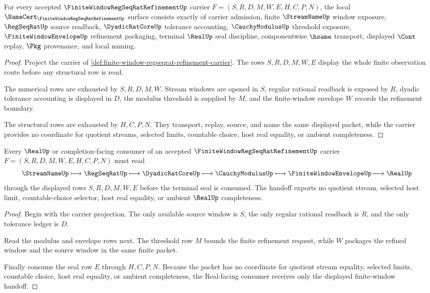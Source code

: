 \begin{theorem}
\label{thm:finite-window-regseqrat-refinement-namecert-obligations}
For every accepted $\FiniteWindowRegSeqRatRefinementUp$ carrier $F=(S,R,D,M,W,E,H,C,P,N)$, the local $\NameCert_{\FiniteWindowRegSeqRatRefinementUp}$ surface consists exactly of carrier admission, finite $\StreamNameUp$ window exposure, $\RegSeqRatUp$ source readback, $\DyadicRatCoreUp$ tolerance accounting, $\CauchyModulusUp$ threshold exposure, $\FiniteWindowEnvelopeUp$ refinement packaging, terminal $\RealUp$ seal discipline, componentwise $\hsame$ transport, displayed $\Cont$ replay, $\Pkg$ provenance, and local naming.
\end{theorem}
\begin{proof}
Project the carrier of \autoref{def:finite-window-regseqrat-refinement-carrier}. The rows $S,R,D,M,W,E$ display the whole finite observation route before any structural row is read.

The numerical rows are exhausted by $S,R,D,M,W$. Stream windows are opened in $S$, regular rational readback is exposed by $R$, dyadic tolerance accounting is displayed in $D$, the modulus threshold is supplied by $M$, and the finite-window envelope $W$ records the refinement boundary.

The structural rows are exhausted by $H,C,P,N$. They transport, replay, source, and name the same displayed packet, while the carrier provides no coordinate for quotient streams, selected limits, countable choice, host real equality, or ambient completeness.
\end{proof}

\begin{theorem}
\label{thm:finite-window-regseqrat-refinement-real-handoff}
Every $\RealUp$ or completion-facing consumer of an accepted $\FiniteWindowRegSeqRatRefinementUp$ carrier $F=(S,R,D,M,W,E,H,C,P,N)$ must read
$$
\StreamNameUp \longmapsto \RegSeqRatUp \longmapsto \DyadicRatCoreUp \longmapsto \CauchyModulusUp \longmapsto \FiniteWindowEnvelopeUp \longmapsto \RealUp
$$
through the displayed rows $S,R,D,M,W,E$ before the terminal seal is consumed. The handoff exports no quotient stream, selected host limit, countable-choice selector, host real equality, or ambient $\RealUp$ completeness.
\end{theorem}
\begin{proof}
Begin with the carrier projection. The only available source window is $S$, the only regular rational readback is $R$, and the only tolerance ledger is $D$.

Read the modulus and envelope rows next. The threshold row $M$ bounds the finite refinement request, while $W$ packages the refined window and the source window in the same finite packet.

Finally consume the seal row $E$ through $H,C,P,N$. Because the packet has no coordinate for quotient stream equality, selected limits, countable choice, host real equality, or ambient completeness, the Real-facing consumer receives only the displayed finite-window handoff.
\end{proof}

